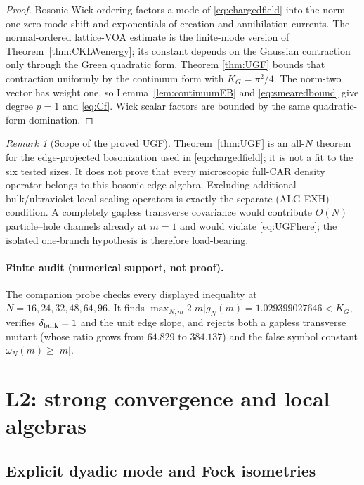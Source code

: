 \documentclass[11pt]{article}
\theoremstyle{remark}
\newtheorem{remark}[theorem]{Remark}
\begin{document}
\begin{proof}
Bosonic Wick ordering factors a mode of \eqref{eq:chargedfield} into the
norm-one zero-mode shift and exponentials of creation and annihilation
currents.  The normal-ordered lattice-VOA estimate is the finite-mode
version of Theorem~\ref{thm:CKLWenergy}; its constant depends on the
Gaussian contraction only through the Green quadratic form.  Theorem
\ref{thm:UGF} bounds that contraction uniformly by the continuum form
with $K_G=\pi^2/4$.  The norm-two vector has weight one, so
Lemma~\ref{lem:continuumEB} and \eqref{eq:smearedbound} give degree
$p=1$ and \eqref{eq:Cf}.  Wick scalar factors are bounded by the same
quadratic-form domination.
\end{proof}

\begin{remark}[Scope of the proved UGF]
Theorem~\ref{thm:UGF} is an all-$N$ theorem for the edge-projected
bosonization used in \eqref{eq:chargedfield}; it is not a fit to the six
tested sizes.  It does not prove that every microscopic full-CAR density
operator belongs to this bosonic edge algebra.  Excluding additional
bulk/ultraviolet local scaling operators is exactly the separate
\textup{(ALG-EXH)} condition.  A completely gapless transverse covariance
would contribute $O(N)$ particle--hole channels already at $m=1$ and
would violate \eqref{eq:UGFhere}; the isolated one-branch hypothesis is
therefore load-bearing.
\end{remark}

\paragraph{Finite audit (numerical support, not proof).}
The companion probe
checks every displayed inequality at
$N=16,24,32,48,64,96$.  It finds
$\max_{N,m}2|m|g_N(m)=1.029399027646<K_G$, verifies
$\delta_{\rm bulk}=1$ and the unit edge slope, and rejects both a
gapless transverse mutant (whose ratio grows from $64.829$ to $384.137$)
and the false symbol constant $\omega_N(m)\ge|m|$.

\section{L2: strong convergence and local algebras}
\label{sec:L2}

\subsection{Explicit dyadic mode and Fock isometries}
\end{document}
